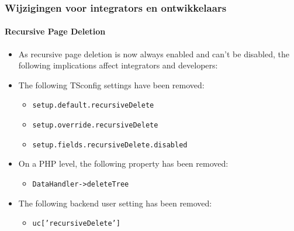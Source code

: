 %

\begin{frame}[fragile]
	\frametitle{Wijzigingen voor integrators en ontwikkelaars}
	\framesubtitle{Recursive Page Deletion}

	\lstset{basicstyle=\tiny\ttfamily}

	\begin{itemize}
		\item As recursive page deletion is now always enabled and can't be disabled,
			the following implications affect integrators and developers:
		\item The following TSconfig settings have been removed:

			\begin{itemize}
				\item \texttt{setup.default.recursiveDelete}
				\item \texttt{setup.override.recursiveDelete}
				\item \texttt{setup.fields.recursiveDelete.disabled}
			\end{itemize}

		\item On a PHP level, the following property has been removed:

			\begin{itemize}
				\item \texttt{DataHandler->deleteTree}
			\end{itemize}

		\item The following backend user setting has been removed:

			\begin{itemize}
				\item \texttt{uc['recursiveDelete']}
			\end{itemize}

	\end{itemize}

\end{frame}

